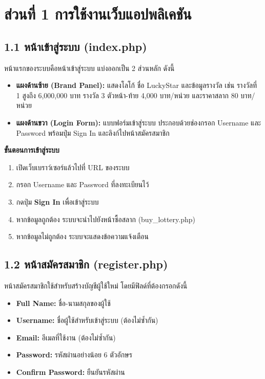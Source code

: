 \documentclass[a4paper,12pt]{article}
\begin{document}
\newpage

\section*{ส่วนที่ 1 การใช้งานเว็บแอปพลิเคชัน}

\subsection*{1.1 หน้าเข้าสู่ระบบ (index.php)}

หน้าแรกของระบบคือหน้าเข้าสู่ระบบ แบ่งออกเป็น 2 ส่วนหลัก ดังนี้

\begin{itemize}[leftmargin=1.5cm, topsep=2pt, itemsep=1pt]
  \item \textbf{แผงด้านซ้าย (Brand Panel):} แสดงโลโก้ ชื่อ LuckyStar และข้อมูลรางวัล เช่น รางวัลที่ 1 สูงถึง 6,000,000 บาท รางวัล 3 ตัวหน้า-ท้าย 4,000 บาท/หน่วย และราคาสลาก 80 บาท/หน่วย
  \item \textbf{แผงด้านขวา (Login Form):} แบบฟอร์มเข้าสู่ระบบ ประกอบด้วยช่องกรอก Username และ Password พร้อมปุ่ม Sign In และลิงก์ไปหน้าสมัครสมาชิก
\end{itemize}

\noindent\textbf{ขั้นตอนการเข้าสู่ระบบ}
\begin{enumerate}[leftmargin=2cm, label=\arabic*., topsep=2pt, itemsep=1pt]
  \item เปิดเว็บเบราว์เซอร์แล้วไปที่ URL ของระบบ
  \item กรอก Username และ Password ที่ลงทะเบียนไว้
  \item กดปุ่ม \textbf{Sign In} เพื่อเข้าสู่ระบบ
  \item หากข้อมูลถูกต้อง ระบบจะนำไปยังหน้าซื้อสลาก (buy\_lottery.php)
  \item หากข้อมูลไม่ถูกต้อง ระบบจะแสดงข้อความแจ้งเตือน
\end{enumerate}

\subsection*{1.2 หน้าสมัครสมาชิก (register.php)}

หน้าสมัครสมาชิกใช้สำหรับสร้างบัญชีผู้ใช้ใหม่ โดยมีฟิลด์ที่ต้องกรอกดังนี้

\begin{itemize}[leftmargin=1.5cm, topsep=2pt, itemsep=1pt]
  \item \textbf{Full Name:} ชื่อ-นามสกุลของผู้ใช้
  \item \textbf{Username:} ชื่อผู้ใช้สำหรับเข้าสู่ระบบ (ต้องไม่ซ้ำกัน)
  \item \textbf{Email:} อีเมลที่ใช้งาน (ต้องไม่ซ้ำกัน)
  \item \textbf{Password:} รหัสผ่านอย่างน้อย 6 ตัวอักษร
  \item \textbf{Confirm Password:} ยืนยันรหัสผ่าน
\end{itemize}
\end{document}
